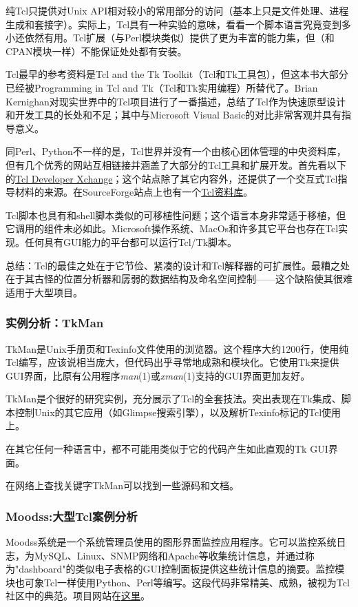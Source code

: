 \documentclass[12pt,oneside]{book}
\begin{document}
纯Tcl只提供对Unix API相对较小的常用部分的访问（基本上只是文件处理、进程生成和套接字）。实际上，Tcl具有一种实验的意味，看看一个脚本语言究竟变到多小还依然有用。Tcl扩展（与Perl模块类似）提供了更为丰富的能力集，但（和CPAN模块一样）不能保证处处都有安装。

Tcl最早的参考资料是Tcl and the Tk Toolkit（Tcl和Tk工具包）\cite{Ousterhout94}，但这本书大部分已经被Programming in Tcl and Tk（Tcl和Tk实用编程）\cite{Welch}所替代了。Brian Kernighan对现实世界中的Tcl项目进行了一番描述\cite{Kernighan95}，总结了Tcl作为快速原型设计和开发工具的长处和不足；其中与Microsoft Visual Basic的对比非常客观并具有指导意义。

同Perl、Python不一样的是，Tcl世界并没有一个由核心团体管理的中央资料库，但有几个优秀的网站互相链接并涵盖了大部分的Tcl工具和扩展开发。首先看以下的\href{http://www.tcltk.com/}{Tcl Developer Xchange}；这个站点除了其它内容外，还提供了一个交互式Tcl指导材料的来源。在SourceForge站点上也有一个\href{http://sourceforge.net/foundry/tcl-foundry/}{Tcl资料库}。

Tcl脚本也具有和shell脚本类似的可移植性问题；这个语言本身非常适于移植，但它调用的组件未必如此。Microsoft操作系统、MacOs和许多其它平台也存在Tcl实现。任何具有GUI能力的平台都可以运行Tcl/Tk脚本。

总结：Tcl的最佳之处在于它节俭、紧凑的设计和Tcl解释器的可扩展性。最糟之处在于其古怪的位置分析器和孱弱的数据结构及命名空间控制——这个缺陷使其很难适用于大型项目。


\subsubsection{实例分析：TkMan}
TkMan是Unix手册页和Texinfo文件使用的浏览器。这个程序大约1200行，使用纯Tcl编写，应该说相当庞大，但代码出乎寻常地成熟和模块化。它使用Tk来提供GUI界面，比原有公用程序\textit{man}(1)或\textit{xman}(1)支持的GUI界面更加友好。

TkMan是个很好的研究实例，充分展示了Tcl的全套技法。突出表现在Tk集成、脚本控制Unix的其它应用（如Glimpse搜索引擎），以及解析Texinfo标记的Tcl使用上。

在其它任何一种语言中，都不可能用类似于它的代码产生如此直观的Tk GUI界面。

在网络上查找关键字TkMan可以找到一些源码和文档。


\subsubsection{Moodss:大型Tcl案例分析}
Moodss系统是一个系统管理员使用的图形界面监控应用程序。它可以监控系统日志，为MySQL、Linux、SNMP网络和Apache等收集统计信息，并通过称为"dashboard"的类似电子表格的GUI控制面板提供这些统计信息的摘要。监控模块也可象Tcl一样使用Python、Perl等编写。这段代码非常精美、成熟，被视为Tcl社区中的典范。项目网站在\href{http://jfontain.free.fr/moodss/}{这里}。
\end{document}
